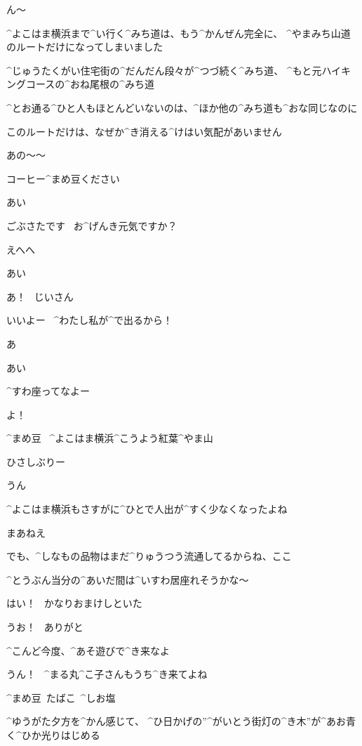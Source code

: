 \page
\Alpha ん〜

\page
\Alpha ^{よこはま}{横浜}まで^{い}{行}く^{みち}{道}は、もう^{かんぜん}{完全}に、
^{やまみち}{山道}のルートだけになってしまいました

\Alpha ^{じゅうたくがい}{住宅街}の^{だんだん}{段々}が^{つづ}{続}く^{みち}{道}、
^{もと}{元}ハイキングコースの^{おね}{尾根}の^{みち}{道}

\page
\Alpha ^{とお}{通}る^{ひと}{人}もほとんどいないのは、^{ほか}{他}の^{みち}{道}も^{おな}{同}じなのに

\Alpha このルートだけは、なぜか^{き}{消}える^{けはい}{気配}があいません

\page[145]
\Alpha あの〜〜

\Alpha コーヒー^{まめ}{豆}ください

\Person あい

\Alpha ごぶさたです
\ お^{げんき}{元気}ですか？

\Alpha えへへ

\Person あい

\Maruko あ！
\ じいさん

\Maruko いいよー
\ ^{わたし}{私}が^{で}{出}るから！

\Alpha あ

\Person あい

\Maruko ^{すわ}{座}ってなよー

\page
\Maruko よ！

\Sign ^{まめ}{豆}
\ ^{よこはま}{横浜}^{こうよう}{紅葉}^{やま}{山}

\Maruko ひさしぶりー

\Alpha うん

\Alpha ^{よこはま}{横浜}もさすがに^{ひとで}{人出}が^{すく}{少}なくなったよね

\Maruko まあねえ

\Maruko でも、^{しなもの}{品物}はまだ^{りゅうつう}{流通}してるからね、ここ

\Maruko ^{とうぶん}{当分}の^{あいだ}{間}は^{いすわ}{居座}れそうかな〜

\Maruko はい！
\ かなりおまけしといた

\Alpha うお！
\ ありがと

\page
\Maruko ^{こんど}{今度}、^{あそ}{遊}びで^{き}{来}なよ

\Alpha うん！
\ ^{まる}{丸}^{こ}{子}さんもうち^{き}{来}てよね

\Sign ^{まめ}{豆}\ たばこ\ ^{しお}{塩}

\page
\Alpha ^{ゆうがた}{夕方}を^{かん}{感}じて、
^{ひ}{日}かげの”^{がいとう}{街灯}の^{き}{木}”が^{あお}{青}く^{ひか}{光}りはじめる

